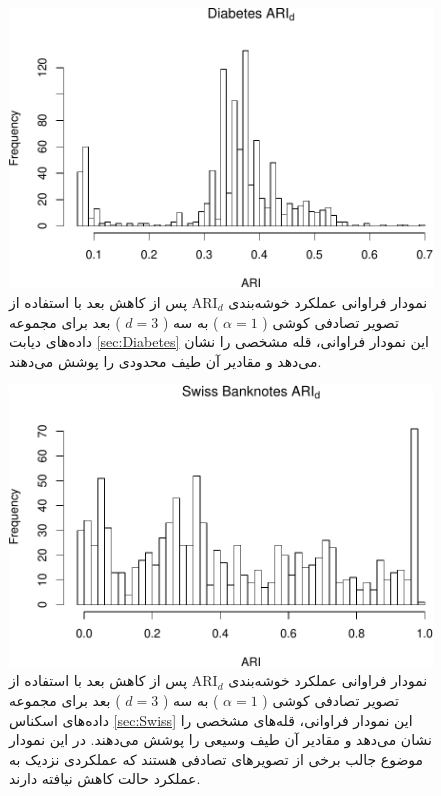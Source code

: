 \begin{figure}[H]
\centering
\includegraphics[width=0.7\linewidth]{Report_files/figure-latex/unnamed-chunk-12-3}
\caption{
نمودار فراوانی عملکرد خوشه‌بندی 
$\mathrm{ARI}_d$
پس از کاهش بعد با استفاده از تصویر تصادفی
کوشی (%
$\alpha=1$%
)
به 
سه (%
$d=3$%
)
بعد برای مجموعه داده‌های
دیابت
\ref{sec:Diabetes}
این نمودار فراوانی،
قله
مشخصی را نشان 
می‌دهد
و مقادیر آن طیف 
محدودی
 را پوشش می‌دهند.
}
\end{figure}

\begin{figure}[H]
\centering
\includegraphics[width=0.7\linewidth]{Report_files/figure-latex/unnamed-chunk-12-4}
\caption{
نمودار فراوانی عملکرد خوشه‌بندی 
$\mathrm{ARI}_d$
پس از کاهش بعد با استفاده از تصویر تصادفی
کوشی (%
$\alpha=1$%
)
به 
سه (%
$d=3$%
)
بعد برای مجموعه داده‌های
اسکناس
\ref{sec:Swiss}
این نمودار فراوانی،
قله‌های
مشخصی را نشان 
می‌دهد
و مقادیر آن طیف 
وسیعی را پوشش می‌دهند. در این نمودار موضوع جالب برخی از تصویر‌های تصادفی هستند که عملکردی نزدیک به عملکرد حالت کاهش نیافته دارند.
}
\end{figure}

